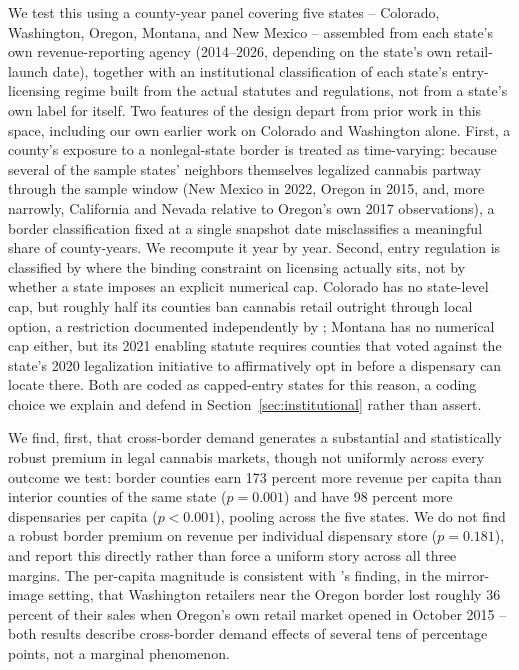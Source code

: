\documentclass[12pt]{article}
\begin{document}
We test this using a county-year panel covering five states -- Colorado, Washington, Oregon, Montana, and New
Mexico -- assembled from each state's own revenue-reporting agency (2014--2026, depending on the state's own
retail-launch date), together with an institutional classification of each state's entry-licensing regime built
from the actual statutes and regulations, not from a state's own label for itself. Two features of the design
depart from prior work in this space, including our own earlier work on Colorado and Washington alone. First,
a county's exposure to a nonlegal-state border is treated as time-varying: because several of the sample
states' neighbors themselves legalized cannabis partway through the sample window (New Mexico in 2022, Oregon
in 2015, and, more narrowly, California and Nevada relative to Oregon's own 2017 observations), a border
classification fixed at a single snapshot date misclassifies a meaningful share of county-years. We recompute
it year by year. Second, entry regulation is classified by where the binding constraint on licensing actually
sits, not by whether a state imposes an explicit numerical cap. Colorado has no state-level cap, but roughly
half its counties ban cannabis retail outright through local option, a restriction documented independently by
\citet{PayanBrownSong2021}; Montana has no numerical cap either, but its 2021 enabling statute requires
counties that voted against the state's 2020 legalization initiative to affirmatively opt in before a
dispensary can locate there. Both are coded as capped-entry states for this reason, a coding choice we explain
and defend in Section~\ref{sec:institutional} rather than assert.

We find, first, that cross-border demand generates a substantial and statistically robust premium in legal
cannabis markets, though not uniformly across every outcome we test: border counties earn 173 percent more
revenue per capita than interior counties of the same state ($p=0.001$) and have 98 percent more
dispensaries per capita ($p<0.001$), pooling across the five states. We do not find a robust border premium
on revenue per individual dispensary store ($p=0.181$), and report this directly rather than force a uniform
story across all three margins. The per-capita magnitude is consistent with \citet{HansenMillerWeber2020}'s
finding, in the mirror-image setting, that Washington retailers near the Oregon border lost roughly 36 percent
of their sales when Oregon's own retail market opened in October 2015 -- both results describe cross-border
demand effects of several tens of percentage points, not a marginal phenomenon.
\end{document}
